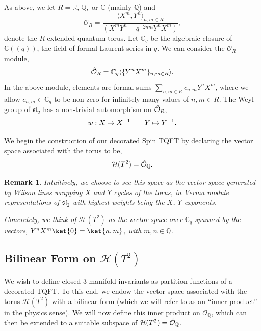 \documentclass{article}
\newcommand{\R}{{\mathbb R}}
\newcommand{\C}{{\mathbb C}}
\newcommand{\Q}{{\mathbb Q}}
\def\be{\begin{equation}}
\def\ee{\end{equation}}
\newtheorem{remark}{Remark}[section]
\numberwithin{corollary}{theorem}
\numberwithin{corollary}{proposition}
\begin{document}
As above, we let $R = \R$, $\Q,$ or $\C$ (mainly $\Q$) and
$$\mathcal{O}_R =\frac{ \langle X^m, Y^n\rangle_{n,m \in R}}{(X^m Y^n - q^{-2nm} Y^n X^m) },$$
denote the $R$-extended quantum torus. Let $\mathbb{C}_q$ be the algebraic closure of $\mathbb{C}((q))$, the field of formal Laurent series in $q$. We can consider the $\mathcal{O}_R$-module, 
$$\Hat{\mathcal{O}}_R = \mathbb{C}_q \langle \{  Y^n X^m\}_{n,m\in R}\rangle.$$
In the above module, elements are formal sums $\sum_{n,m\in R} c_{n,m} Y^n X^m$, where we allow $c_{n,m} \in \mathbb{C}_q$ to be non-zero for infinitely many values of $n,m \in R$. The Weyl group of $\mathfrak{sl}_2$ has a non-trivial automorphism on $\Hat{\mathcal{O}}_R$,
$$w: X\mapsto X^{-1}  \hspace{7mm}Y\mapsto Y^{-1}.$$

We begin the construction of our decorated $\mathrm{Spin}$ TQFT by declaring the vector space associated with the torus to be, 
\be \mathcal{H}(T^2) = \Hat{\mathcal{O}}_\Q . \ee

\begin{remark}
    Intuitively, we choose to see this space as the vector space generated by Wilson lines wrapping $X$ and $Y$ cycles of the torus, in Verma module representations of $\mathfrak{sl}_2$ with highest weights being the $X$, $Y$ exponents.

    Concretely, we think of $\mathcal{H}(T^2)$ as the vector space over $\C_q$ spanned by the vectors, $Y^n X^m \ket{0} = \ket{n,m}$, with $m, n \in \Q$.
\end{remark}





\subsection{Bilinear Form on \texorpdfstring{$\mathcal{H}(T^2)$}{H(T2)}}
We wish to define closed 3-manifold invariants as partition functions of a decorated TQFT. To this end, we endow the vector space associated with the torus $\mathcal{H}(T^2)$ with a bilinear form (which we will refer to as an ``inner product'' in the physics sense). We will now define this inner product on $\mathcal{O}_{\Q}$, which can then be extended to a suitable subspace of $\mathcal{H}(T^2) = \Hat{\mathcal{O}}_\Q$.
\end{document}
